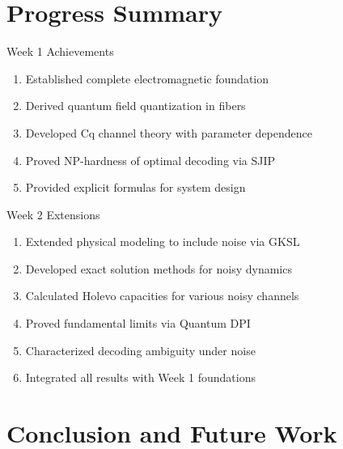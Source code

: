 \documentclass{beamer}
\theoremstyle{definition}
\theoremstyle{plain}
\begin{document}
\section{Progress Summary}

\begin{frame}{Week 1 Achievements}
    \begin{enumerate}
        \item Established complete electromagnetic foundation
        \item Derived quantum field quantization in fibers
        \item Developed Cq channel theory with parameter dependence
        \item Proved NP-hardness of optimal decoding via SJIP
        \item Provided explicit formulas for system design
    \end{enumerate}
\end{frame}

\begin{frame}{Week 2 Extensions}
    \begin{enumerate}
        \item Extended physical modeling to include noise via GKSL
        \item Developed exact solution methods for noisy dynamics
        \item Calculated Holevo capacities for various noisy channels
        \item Proved fundamental limits via Quantum DPI
        \item Characterized decoding ambiguity under noise
        \item Integrated all results with Week 1 foundations
    \end{enumerate}
\end{frame}

\section{Conclusion and Future Work}
\end{document}
